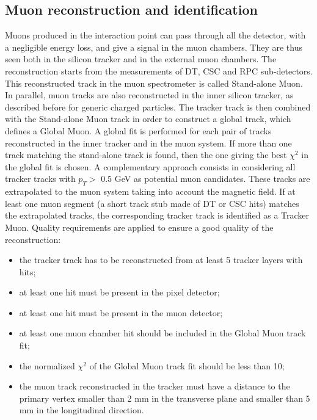 \subsection*{Muon reconstruction and identification}
Muons produced in the interaction point can pass through all the detector, with a negligible energy loss, and give a signal in the muon chambers.
They are thus seen both in the silicon tracker and in the external muon chambers. 
The reconstruction starts from the measurements of DT, CSC and RPC sub-detectors. This reconstructed track in the muon spectrometer is called
Stand-alone Muon.
In parallel, muon tracks are also reconstructed in the inner silicon tracker, as described before for generic charged particles.
The tracker track is then combined with the Stand-alone Muon track in order to construct
a global track, which defines a Global Muon. A global fit is performed for each pair of
tracks reconstructed in the inner tracker and in the muon system. If more than one track
matching the stand-alone track is found, then the one giving the best $\chi^2$ in the global fit
is chosen. A complementary approach consists in considering all tracker tracks with $p_T>$ 0.5 GeV as
potential muon candidates. These tracks are extrapolated to the muon system taking
into account the magnetic field. If at least one muon segment (a short track stub made of
DT or CSC hits) matches the extrapolated tracks, the corresponding tracker track is
identified as a Tracker Muon.
Quality requirements are applied to ensure a good quality of the reconstruction:
\begin{itemize}
 \item the tracker track has to be reconstructed from at least 5 tracker layers with hits; 
 \item at least one hit must be present in the pixel detector;
 \item at least one hit must be present in the muon detector;
 \item at least one muon chamber hit should be included in the Global Muon track fit;
 \item the normalized $\chi^2$ of the Global Muon track fit should be less than 10;
 \item the muon track reconstructed in the tracker must have a distance to the primary
vertex smaller than 2 mm in the transverse plane and smaller than 5 mm in
the longitudinal direction.
\end{itemize}
